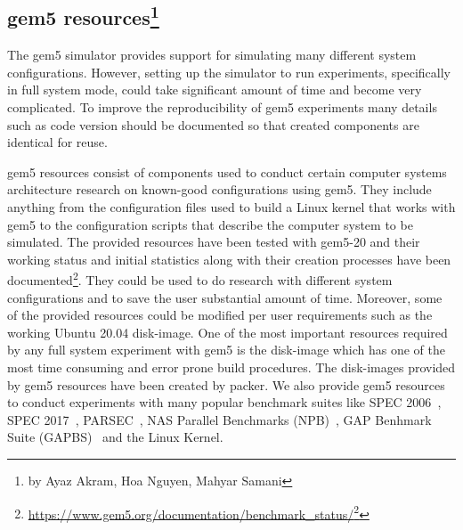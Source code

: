 \subsection[gem5 resources]{gem5 resources\footnote{by Ayaz Akram, Hoa Nguyen, Mahyar Samani}}

The gem5 simulator provides support for simulating many different system configurations. However,
setting up the simulator to run experiments, specifically in full system mode, could take significant
amount of time and become very complicated. To improve the reproducibility of gem5 experiments
many details such as code version should be documented so that created components are identical for
reuse.

gem5 resources consist of components used to conduct certain computer systems architecture
research on known-good configurations using gem5. They include anything from the configuration
files used to build a Linux kernel that works with gem5 to the configuration scripts that
describe the computer system to be simulated. The provided resources have been tested with gem5-20
and their working status and initial statistics along with their creation processes have been documented\footnote{\url{https://www.gem5.org/documentation/benchmark_status/}\footnote{\url{https://gem5.googlesource.com/public/gem5-resources}}}.
They could be used to do research with different system configurations and to save the user substantial amount of time.
Moreover, some of the provided resources could be modified per user requirements such as the working Ubuntu 20.04 disk-image.
One of the most important resources required by any full system experiment with gem5 is the disk-image
which has one of the most time consuming and error prone build procedures. The disk-images provided by
gem5 resources have been created by packer. We also provide gem5 resources to conduct experiments with many
popular benchmark suites like SPEC 2006~\cite{spec06}, SPEC 2017~\cite{spec17}, PARSEC~\cite{parsec},
NAS Parallel Benchmarks (NPB)~\cite{npb}, GAP Benhmark Suite (GAPBS)~\cite{gapbs} and the Linux Kernel.
